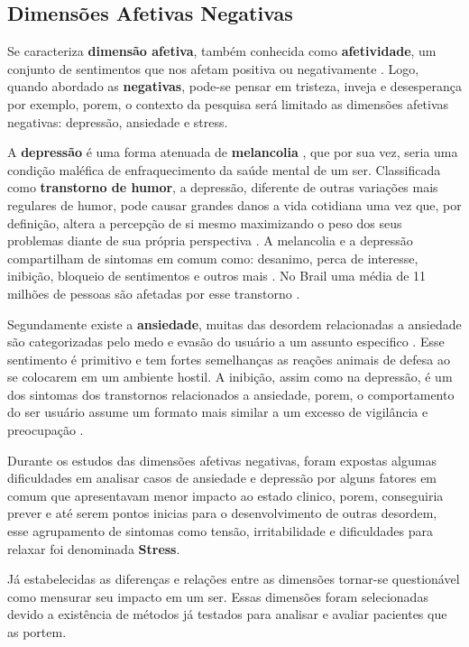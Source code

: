 \subsection{Dimensões Afetivas Negativas}
Se caracteriza \textbf{dimensão afetiva}, também conhecida como \textbf{afetividade}, um conjunto de sentimentos que nos afetam positiva ou negativamente \cite{pinto2009afetos}. Logo, quando abordado as \textbf{negativas}, pode-se pensar em tristeza, inveja e desesperança por exemplo, porem, o contexto da pesquisa será limitado as dimensões afetivas negativas: depressão, ansiedade e stress.

A \textbf{depressão} é uma forma atenuada de \textbf{melancolia} \cite{roudinesco2000psicanalise}, que por sua vez, seria uma condição maléfica de enfraquecimento da saúde mental de um ser. Classificada como \textbf{transtorno de humor}, a depressão, diferente de outras variações mais regulares de humor, pode causar grandes danos a vida cotidiana uma vez que, por definição, altera a percepção de si mesmo maximizando o peso dos seus problemas diante de sua própria perspectiva \cite{esteves2006depressao}. A melancolia e a depressão compartilham de sintomas em comum como: desanimo, perca de interesse, inibição, bloqueio de sentimentos e outros mais \cite[28]{freud2014livro}. No Brail uma média de 11 milhões de pessoas são afetadas por esse transtorno \cite{paho2017-letstalk}.

Segundamente existe a \textbf{ansiedade}, muitas das desordem relacionadas a ansiedade são categorizadas pelo medo e evasão do usuário a um assunto especifico \cite[393]{dsmiv}. Esse sentimento é primitivo e tem fortes semelhanças as reações animais de defesa ao se colocarem em um ambiente hostil. A inibição, assim como na depressão, é um dos sintomas dos transtornos relacionados a ansiedade, porem, o comportamento do ser usuário assume um formato mais similar a um excesso de vigilância e preocupação \cite{margis2003relaccao}.

Durante os estudos das dimensões afetivas negativas, foram expostas algumas dificuldades em analisar casos de ansiedade e depressão por alguns fatores em comum que apresentavam menor impacto ao estado clinico, porem, conseguiria prever e até serem pontos inicias para o desenvolvimento de outras desordem, esse agrupamento de sintomas como tensão, irritabilidade e dificuldades para relaxar foi denominada \textbf{Stress}. \cite{lovibond1995structure, ribeiro2004contribuiccao, margis2003relaccao}

Já estabelecidas as diferenças e relações entre as dimensões tornar-se questionável como mensurar seu impacto em um ser. Essas dimensões foram selecionadas devido a existência de métodos já testados para analisar e avaliar pacientes que as portem.
